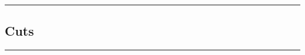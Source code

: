 \documentclass[a4paper,12pt]{article}
\begin{document}
\vspace{0em} %
\hrule height 1pt width 1\textwidth %
\vspace{1em} %


\subsection{Cuts}

\vspace{1em} %
\hrule height 1pt width 1\textwidth %
\vspace{1em} %
\end{document}
